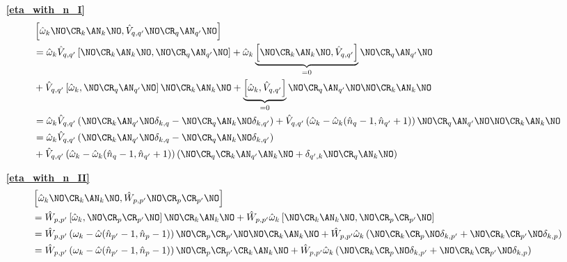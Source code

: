 \begin{appendix}
\begin{itemize}
\item[\textbf{\ref{eta_with_n_I}}] 
\begin{align}
& \left[ \hat\omega_k \NO\CR_k\AN_k\NO,\hat V_{q,q^\prime}\NO \CR_q\AN_{q^\prime}\NO\right]\nonumber\\
&= \hat\omega_k \hat V_{q,q^\prime} \left[ \NO\CR_k\AN_k\NO,\NO \CR_q\AN_{q^\prime}\NO\right] + \hat\omega_k   \underbrace{\left[ \NO\CR_k\AN_k\NO,\hat V_{q,q^\prime}\right]}_{=0} \NO \CR_q\AN_{q^\prime}\NO \nonumber \\ 
&+ \hat V_{q,q^\prime} \left[ \hat\omega_k,\NO \CR_q\AN_{q^\prime}\NO\right]  \NO\CR_k\AN_k\NO + \underbrace{\left[ \hat\omega_k ,\hat V_{q,q^\prime}\right]}_{=0}\NO \CR_q\AN_{q^\prime}\NO \NO\CR_k\AN_k\NO \nonumber \\
&= \hat\omega_k \hat V_{q,q^\prime} \left(\NO\CR_k\AN_{q^\prime}\NO\delta_{k,q}-\NO\CR_q\AN_k\NO\delta_{k,q^\prime}\right) + \hat V_{q,q^\prime} \left(\hat\omega_k - \hat\omega_k(\hat n_q-1,\hat n_{q^\prime}+1)\right) \NO \CR_q\AN_{q^\prime}\NO \NO\CR_k\AN_k\NO\nonumber\\
&= \hat\omega_k \hat V_{q,q^\prime} \left(\NO\CR_k\AN_{q^\prime}\NO\delta_{k,q}-\NO\CR_q\AN_k\NO\delta_{k,q^\prime}\right) \nonumber \\
& + \hat V_{q,q^\prime} \left(\hat\omega_k - \hat\omega_k(\hat n_q-1,\hat n_{q^\prime}+1)\right) \left(\NO \CR_q\CR_k\AN_{q^\prime}\AN_k\NO+\delta_{q^\prime,k}\NO\CR_{q}\AN_k\NO\right)
\end{align}
\item[\textbf{\ref{eta_with_n_II}}] 
\begin{align}
&\left[\hat\omega_k \NO\CR_k\AN_k\NO,\hat W_{p,p^\prime}\NO \CR_p\CR_{p^\prime}\NO\right] \nonumber \\
&=\hat W_{p,p^\prime} \left[\hat\omega_k ,\NO \CR_p\CR_{p^\prime}\NO\right] \NO\CR_k\AN_k\NO + \hat W_{p,p^\prime}\hat\omega_k \left[ \NO\CR_k\AN_k\NO,\NO \CR_p\CR_{p^\prime}\NO\right] \nonumber\\
&= \hat W_{p,p^\prime} \left(\omega_k-\hat\omega(\hat n_{p^\prime}-1,\hat n_p -1)\right)\NO \CR_p\CR_{p^\prime}\NO\NO\CR_k\AN_k\NO + \hat W_{p,p^\prime}\hat\omega_k \left(\NO\CR_k\CR_p\NO\delta_{k,p^\prime}+\NO\CR_k\CR_{p^\prime}\NO\delta_{k,p}\right)\nonumber\\
&= \hat W_{p,p^\prime} \left(\omega_k-\hat\omega(\hat n_{p^\prime}-1,\hat n_p -1)\right)\NO \CR_p\CR_{p^\prime}\CR_k\AN_k\NO + \hat W_{p,p^\prime}\hat\omega_k \left(\NO\CR_k\CR_p\NO\delta_{k,p^\prime}+\NO\CR_k\CR_{p^\prime}\NO\delta_{k,p}\right)

\end{align}
\end{itemize}
\end{appendix}
